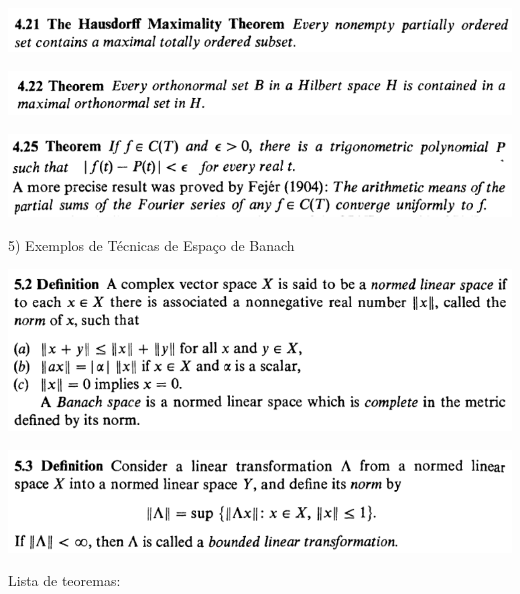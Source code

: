 \documentclass[12pt]{article}
\begin{document}
		\begin{center}
		\includegraphics{4ponto21}
		\end{center}

		\begin{center}
		\includegraphics{4ponto22}
		\end{center}

		\begin{center}
		\includegraphics{4ponto25}
		\end{center}

\vspace{3mm}

5) Exemplos de T\'ecnicas de Espa\c{c}o de Banach

\vspace{3mm}

		\begin{center}
		\includegraphics{d5ponto2}
		\end{center}

		\begin{center}
		\includegraphics{d5ponto3}
		\end{center}

Lista de teoremas:
\end{document}
